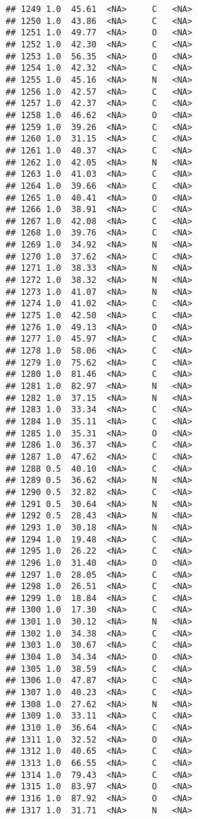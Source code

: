 \documentclass[
]{article}
\begin{document}
\begin{verbatim}
## 1249 1.0  45.61  <NA>     C   <NA>
## 1250 1.0  43.86  <NA>     C   <NA>
## 1251 1.0  49.77  <NA>     O   <NA>
## 1252 1.0  42.30  <NA>     C   <NA>
## 1253 1.0  56.35  <NA>     O   <NA>
## 1254 1.0  42.32  <NA>     C   <NA>
## 1255 1.0  45.16  <NA>     N   <NA>
## 1256 1.0  42.57  <NA>     C   <NA>
## 1257 1.0  42.37  <NA>     C   <NA>
## 1258 1.0  46.62  <NA>     O   <NA>
## 1259 1.0  39.26  <NA>     C   <NA>
## 1260 1.0  31.15  <NA>     C   <NA>
## 1261 1.0  40.37  <NA>     C   <NA>
## 1262 1.0  42.05  <NA>     N   <NA>
## 1263 1.0  41.03  <NA>     C   <NA>
## 1264 1.0  39.66  <NA>     C   <NA>
## 1265 1.0  40.41  <NA>     O   <NA>
## 1266 1.0  38.91  <NA>     C   <NA>
## 1267 1.0  42.08  <NA>     C   <NA>
## 1268 1.0  39.76  <NA>     C   <NA>
## 1269 1.0  34.92  <NA>     N   <NA>
## 1270 1.0  37.62  <NA>     C   <NA>
## 1271 1.0  38.33  <NA>     N   <NA>
## 1272 1.0  38.32  <NA>     N   <NA>
## 1273 1.0  41.07  <NA>     N   <NA>
## 1274 1.0  41.02  <NA>     C   <NA>
## 1275 1.0  42.50  <NA>     C   <NA>
## 1276 1.0  49.13  <NA>     O   <NA>
## 1277 1.0  45.97  <NA>     C   <NA>
## 1278 1.0  58.06  <NA>     C   <NA>
## 1279 1.0  75.62  <NA>     C   <NA>
## 1280 1.0  81.46  <NA>     C   <NA>
## 1281 1.0  82.97  <NA>     N   <NA>
## 1282 1.0  37.15  <NA>     N   <NA>
## 1283 1.0  33.34  <NA>     C   <NA>
## 1284 1.0  35.11  <NA>     C   <NA>
## 1285 1.0  35.31  <NA>     O   <NA>
## 1286 1.0  36.37  <NA>     C   <NA>
## 1287 1.0  47.62  <NA>     C   <NA>
## 1288 0.5  40.10  <NA>     C   <NA>
## 1289 0.5  36.62  <NA>     N   <NA>
## 1290 0.5  32.82  <NA>     C   <NA>
## 1291 0.5  30.64  <NA>     N   <NA>
## 1292 0.5  28.43  <NA>     N   <NA>
## 1293 1.0  30.18  <NA>     N   <NA>
## 1294 1.0  19.48  <NA>     C   <NA>
## 1295 1.0  26.22  <NA>     C   <NA>
## 1296 1.0  31.40  <NA>     O   <NA>
## 1297 1.0  28.05  <NA>     C   <NA>
## 1298 1.0  26.51  <NA>     C   <NA>
## 1299 1.0  18.84  <NA>     C   <NA>
## 1300 1.0  17.30  <NA>     C   <NA>
## 1301 1.0  30.12  <NA>     N   <NA>
## 1302 1.0  34.38  <NA>     C   <NA>
## 1303 1.0  30.67  <NA>     C   <NA>
## 1304 1.0  34.34  <NA>     O   <NA>
## 1305 1.0  38.59  <NA>     C   <NA>
## 1306 1.0  47.87  <NA>     C   <NA>
## 1307 1.0  40.23  <NA>     C   <NA>
## 1308 1.0  27.62  <NA>     N   <NA>
## 1309 1.0  33.11  <NA>     C   <NA>
## 1310 1.0  36.64  <NA>     C   <NA>
## 1311 1.0  32.52  <NA>     O   <NA>
## 1312 1.0  40.65  <NA>     C   <NA>
## 1313 1.0  66.55  <NA>     C   <NA>
## 1314 1.0  79.43  <NA>     C   <NA>
## 1315 1.0  83.97  <NA>     O   <NA>
## 1316 1.0  87.92  <NA>     O   <NA>
## 1317 1.0  31.71  <NA>     N   <NA>

\end{verbatim}
\end{document}
